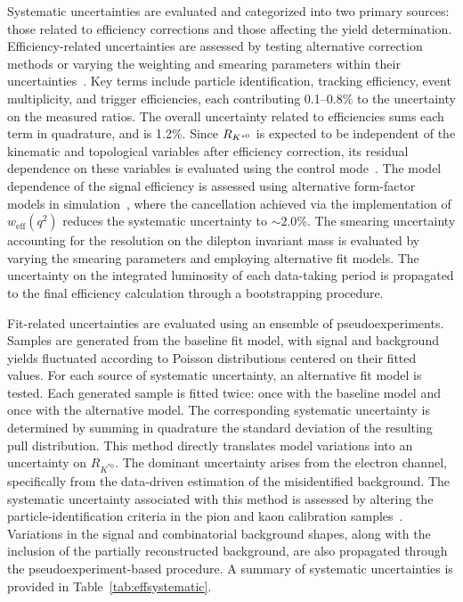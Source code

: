 Systematic uncertainties are evaluated and categorized into two primary sources: those related to efficiency corrections and those affecting the yield determination. Efficiency-related uncertainties are assessed by testing alternative correction methods or varying the weighting and smearing parameters within their
uncertainties~\cite{LHCb-PAPER-2022-045}. Key terms include particle identification, tracking efficiency, event multiplicity, and trigger efficiencies, each
contributing 0.1--0.8\% to the uncertainty on the measured ratios. The overall uncertainty related to efficiencies sums each term in quadrature, and is 1.2\%.
Since $R_{{{K}^{*0}}}$ is expected to be independent of the kinematic and topological variables after efficiency correction, its residual dependence on these
variables  is evaluated using the control mode~\cite{LHCb-PAPER-2022-045}. The model dependence of the signal efficiency is assessed using alternative form-factor models in simulation~\cite{Ali:1999mm},
where the cancellation achieved via the implementation of $w_{\mathrm{eff}}(q^2)$ reduces the systematic uncertainty to $\sim2.0$\%. The \qsq smearing uncertainty accounting for the resolution on the dilepton invariant mass is evaluated by varying the smearing parameters and employing alternative fit models. The uncertainty on the integrated luminosity of each data-taking period is propagated to the final efficiency calculation through a bootstrapping procedure.

Fit-related uncertainties are evaluated using an ensemble of pseudoexperiments. Samples are generated from the baseline fit model, with
signal and background yields fluctuated according to Poisson distributions centered on their fitted values. For each source of systematic uncertainty, an alternative fit model is tested. Each generated sample is fitted twice: once with the baseline model and once with the alternative model. The corresponding systematic uncertainty is determined by summing in quadrature the standard deviation of the resulting pull distribution. This method directly translates model variations into an uncertainty on $R_{K^{*0}}$.
The dominant uncertainty arises from the electron channel, specifically from the data-driven estimation of the misidentified background. The systematic uncertainty
associated with this method is assessed by altering the particle-identification criteria in the pion and kaon calibration samples~\cite{LHCb-PUB-2016-021, LHCb-DP-2018-001}.
Variations in the signal and combinatorial background shapes, along with the inclusion of the partially reconstructed background, are also propagated through the pseudoexperiment-based procedure. A summary of systematic uncertainties is provided in Table~\ref{tab:effsystematic}.

